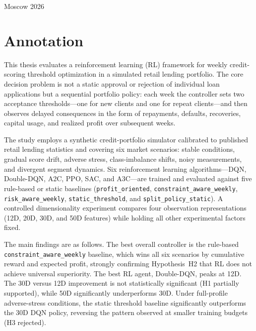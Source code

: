 \documentclass[12pt,a4paper]{article}
\begin{document}
\begin{titlepage}
    \vspace{\fill}

    \begin{center}
        Moscow 2026
    \end{center}

\end{titlepage}

\setcounter{page}{2}

\section*{Annotation}

This thesis evaluates a reinforcement learning (RL) framework for weekly credit-scoring threshold optimization in a simulated retail lending portfolio. The core decision problem is not a static approval or rejection of individual loan applications but a sequential portfolio policy: each week the controller sets two acceptance thresholds---one for new clients and one for repeat clients---and then observes delayed consequences in the form of repayments, defaults, recoveries, capital usage, and realized profit over subsequent weeks.

The study employs a synthetic credit-portfolio simulator calibrated to published retail lending statistics and covering six market scenarios: stable conditions, gradual score drift, adverse stress, class-imbalance shifts, noisy measurements, and divergent segment dynamics. Six reinforcement learning algorithms---DQN, Double-DQN, A2C, PPO, SAC, and A3C---are trained and evaluated against five rule-based or static baselines (\texttt{profit\_oriented}, \texttt{constraint\_aware\_weekly}, \texttt{risk\_aware\_weekly}, \texttt{static\_threshold}, and \texttt{split\_policy\_static}). A controlled dimensionality experiment compares four observation representations (12D, 20D, 30D, and 50D features) while holding all other experimental factors fixed.

The main findings are as follows. The best overall controller is the rule-based \texttt{constraint\_aware\_weekly} baseline, which wins all six scenarios by cumulative reward and expected profit, strongly confirming Hypothesis~H2 that RL does not achieve universal superiority. The best RL agent, Double-DQN, peaks at 12D. The 30D versus 12D improvement is not statistically significant (H1 partially supported), while 50D significantly underperforms 30D. Under full-profile adverse-stress conditions, the static threshold baseline significantly outperforms the 30D DQN policy, reversing the pattern observed at smaller training budgets (H3 rejected).
\end{document}
